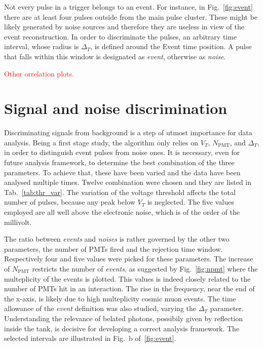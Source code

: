  Not every pulse in a trigger belongs to an event.
 For instance, in Fig.~\ref{fig:event} there are at least four pulses outside from the main pulse cluster.
 These might be likely generated by noise sources and therefore they are useless in view of the event %
 reconstruction.
 In order to discriminate the pulses, an arbitrary time interval, whose radius is $\Delta_T$, is defined around %
 the Event time position.
 A pulse that falls within this window is designated as \emph{event}, otherwise as \emph{noise}.

 \textcolor{red}{Other orrelation plots.}

\section{Signal and noise discrimination}
\label{sec:signal}


 Discriminating signals from background is a step of utmost importance for data analysis.
 Being a first stage study, the algorithm only relies on $V_T$, $N_{\mathrm{PMT}}$, and $\Delta_T$, %
 in order to distinguish event pulses from noise ones.
 It is necessary, even for future analysis framework, to determine the best combination of the three parameters.
 To achieve that, these have been varied and the data have been analysed multiple times.
 Twelve combination were chosen and they are listed in Tab.~\ref{tab:thr_var}.
 The variation of the voltage threshold affects the total number of pulses, because any peak below $V_T$ is %
 neglected.
 The five values employed are all well above the electronic noise, which is of the order of the millivolt.

 The ratio between \emph{events} and \emph{noises} is rather governed by the other two parameters, %
 the number of PMTs fired and the rejection time window.
 Respectively four and five values were picked for these parameters.
 The increase of $N_{\mathrm{PMT}}$ restricts the number of \emph{events}, as suggested by Fig.~\ref{fig:npmt} where the %
 multeplicity of the events is plotted.
 This values is indeed closely related to the number of PMTs hit in an interaction.
 The rise in the frequency, near the end of the x-axis, is likely due to high multeplicity cosmic muon events.
 The time allowance of the \emph{event} definition was also studied, varying the $\Delta_T$ parameter.
 Understanding the relevance of belated photons, possibily given by reflection inside the tank, is decisive for %
 developing a correct analysis framework.
 The selected intervals are illustrated in Fig.~b of~\ref{fig:event}.

